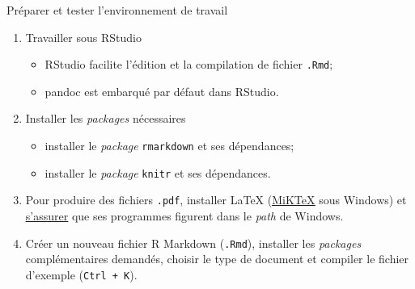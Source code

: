 \documentclass[12pt,ignorenonframetext,handout,]{beamer}
\providecommand{\tightlist}{%
  \setlength{\itemsep}{0pt}\setlength{\parskip}{0pt}}
\begin{document}
\begin{frame}[fragile]{Préparer et tester l’environnement de travail}
\protect\hypertarget{preparer-et-tester-lenvironnement-de-travail}{}

\begin{enumerate}
[1.]
\tightlist
\item
  Travailler sous RStudio

  \begin{itemize}
  \tightlist
  \item
    RStudio facilite l’édition et la compilation de fichier
    \texttt{.Rmd};
  \item
    pandoc est embarqué par défaut dans RStudio.
  \end{itemize}
\end{enumerate}

\pause \bigskip

\begin{enumerate}
[1.]
\setcounter{enumi}{1}
\tightlist
\item
  Installer les \emph{packages} nécessaires

  \begin{itemize}
  \tightlist
  \item
    installer le \emph{package} \texttt{rmarkdown} et ses dépendances;
  \item
    installer le \emph{package} \texttt{knitr} et ses dépendances.
  \end{itemize}
\end{enumerate}

\pause \bigskip

\begin{enumerate}
[1.]
\setcounter{enumi}{2}
\tightlist
\item
  Pour produire des fichiers \texttt{.pdf}, installer LaTeX
  (\href{https://miktex.org/}{\underline{MiKTeX}} sous Windows) et
  \href{http://superuser.com/questions/341192/how-can-i-display-the-contents-of-an-environment-variable-from-the-command-promp}{\underline{s'assurer}}
  que ses programmes figurent dans le \emph{path} de Windows.
\end{enumerate}

\pause \bigskip

\begin{enumerate}
[1.]
\setcounter{enumi}{3}
\tightlist
\item
  Créer un nouveau fichier R Markdown (\texttt{.Rmd}), installer les
  \emph{packages} complémentaires demandés, choisir le type de document
  et compiler le fichier d’exemple (\texttt{Ctrl\ +\ K}).
\end{enumerate}

\end{frame}
\end{document}
